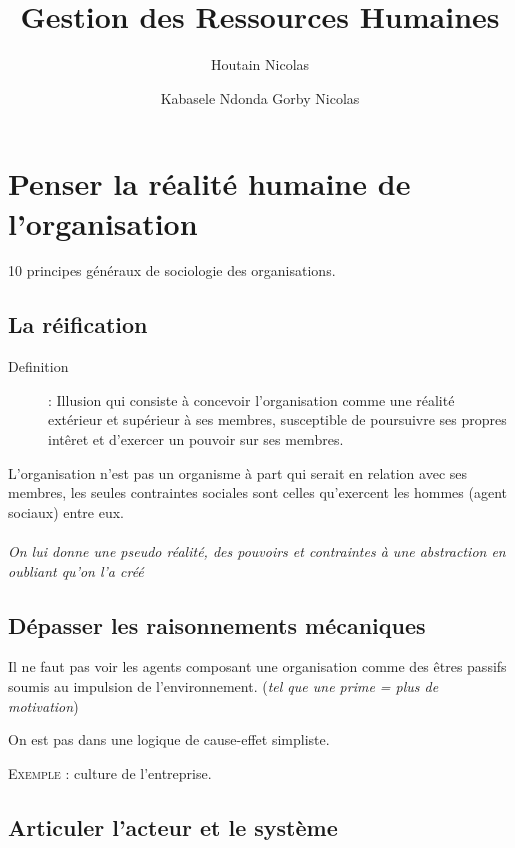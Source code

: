 \documentclass[11pt]{article} %
\title{Gestion des Ressources Humaines}
\author{Houtain Nicolas \and Kabasele Ndonda Gorby Nicolas}
\begin{document}
\maketitle

\section{Penser la réalité humaine de l'organisation}

10 principes généraux de sociologie des organisations.

\subsection{La réification}
\begin{description}
    \item[Definition]   :    Illusion   qui   consiste    à   concevoir
l'organisation  comme  une réalité  extérieur  et  supérieur à  ses
membres, susceptible de  poursuivre ses propres intêret  et d'exercer un
pouvoir sur ses membres.
\end{description}

L'organisation n'est  pas un  organisme à part  qui serait  en relation
avec  ses   membres,  les   seules  contraintes  sociales   sont  celles
qu'exercent les hommes (agent sociaux) entre eux.

\paragraph{ } \textit{On lui donne une pseudo réalité, des pouvoirs et
contraintes à une abstraction en oubliant qu'on l'a créé}


\subsection{Dépasser les raisonnements mécaniques} Il ne faut pas voir
les agents composant une organisation comme des êtres passifs soumis au
impulsion  de l'environnement.  (\textit{tel  que une  prime  = plus  de
motivation})

On est pas dans une logique de cause-effet simpliste.

\textsc{Exemple} : culture de l'entreprise.


\subsection{Articuler l'acteur et le système}
\end{document}
